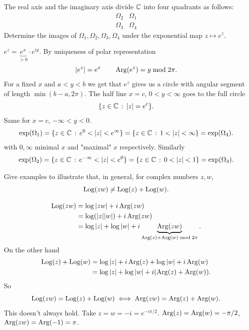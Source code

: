 \documentclass[10pt, a4paper]{article}
\begin{document}
\begin{problem}
    The real axis and the imaginary axis divide $\mathbb{C}$ into four quadrants as follows:
    \[
    \begin{array}{c|c}
         \Omega_2 & \Omega_1  \\
         \hline
         \Omega_3 & \Omega_4
    \end{array}
    \]
    Determine the images of $\Omega_1, \Omega_2, \Omega_3, \Omega_4$ under the exponential map $z \mapsto e ^ z$.

    \begin{solution}
        $e ^ z = \underbrace{e ^ x}_{> 0} \cdot e ^ {iy}$.
        By uniqueness of polar representation
        \[
        |e ^ z| = e ^ x\qquad \operatorname{Arg}(e ^ z) = y\bmod{2\pi}.
        \]
        For a fixed $x$ and $a < y < b$ we get that $e ^ z$ gives us a circle with angular segment of length $\min(b - a, 2\pi)$.
        The half line $x = c$,
        $0 < y < \infty$ goes to the full circle
        \[
        \{z \in \mathbb{C}\,:\,|z| = e ^ c\}.
        \]
        Same for $x = c$,
        $-\infty < y < 0$.
        \[
        \exp(\Omega_1) = \{z \in \mathbb{C}\,:\, e ^ 0 < |z| < e ^ {\infty}\} = \{z \in \mathbb{C}\,:\, 1 < |z| < \infty\} = \exp(\Omega_4).
        \]
        with $0, \infty$ minimal $x$ and
        "maximal"
        $x$ respectively.
        Similarly
        \[
        \exp(\Omega_2) = \{z \in \mathbb{C}\,:\,e ^ {-\infty} < |z| < e ^ 0\} = \{z \in \mathbb{C}\,:\, 0 < |z| < 1\} = \exp(\Omega_3).
        \]
    \end{solution}
\end{problem}

\begin{problem}
    Give examples to illustrate that,
    in general,
    for complex numbers $z, w$,
    \[
    \operatorname{Log}(zw) \neq \operatorname{Log}(z) + \operatorname{Log}(w).
    \]

    \begin{solution}
        \begin{align*}
            \operatorname{Log}(zw) &= \log|zw| + i\operatorname{Arg}(zw) \\
            &= \log(|z||w|) + i\operatorname{Arg}(zw) \\
            &= \log|z| + \log|w| + i\underbrace{\operatorname{Arg}(zw)}_{\operatorname{Arg}(z) + \operatorname{Arg}(w)\bmod{2\pi}}.
        \end{align*}
        On the other hand
        \begin{align*}
            \operatorname{Log}(z) + \operatorname{Log}(w) &= \log|z| + i\operatorname{Arg}(z) + \log|w| + i\operatorname{Arg}(w) \\
            &= \log|z| + \log|w| + i(\operatorname{Arg}(z) + \operatorname{Arg}(w)).
        \end{align*}
        So
        \[
        \operatorname{Log}(zw) = \operatorname{Log}(z) + \operatorname{Log}(w) \iff \operatorname{Arg}(zw) = \operatorname{Arg}(z) + \operatorname{Arg}(w).
        \]
        This doesn't always hold.
        Take $z = w = -i = e ^ {-i\pi / 2}$.
        $\operatorname{Arg}(z) = \operatorname{Arg}(w) = -\pi / 2$,
        $\operatorname{Arg}(zw) = \operatorname{Arg}(-1) = \pi$.
        
    \end{solution}
\end{problem}
\end{document}
